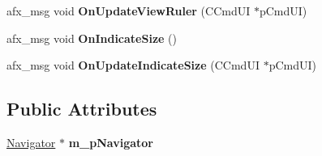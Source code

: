 \begin{DoxyCompactItemize}
\item 
\mbox{\label{class_c_main_view_a3746d556ae77e54015535bd070b248a6}} 
afx\+\_\+msg void {\bfseries On\+Update\+View\+Ruler} (C\+Cmd\+UI $\ast$p\+Cmd\+UI)
\item 
\mbox{\label{class_c_main_view_a0cba96698760791da1ddd9f78f0d78eb}} 
afx\+\_\+msg void {\bfseries On\+Indicate\+Size} ()
\item 
\mbox{\label{class_c_main_view_abe25a8c945ca92c6f6df3d5e2649c1f3}} 
afx\+\_\+msg void {\bfseries On\+Update\+Indicate\+Size} (C\+Cmd\+UI $\ast$p\+Cmd\+UI)
\end{DoxyCompactItemize}
\subsection*{Public Attributes}
\begin{DoxyCompactItemize}
\item 
\mbox{\label{class_c_main_view_a563cc9c66c8a922fecafada5c2cc2d6f}} 
\mbox{\hyperlink{class_navigator}{Navigator}} $\ast$ {\bfseries m\+\_\+p\+Navigator}
\end{DoxyCompactItemize}
